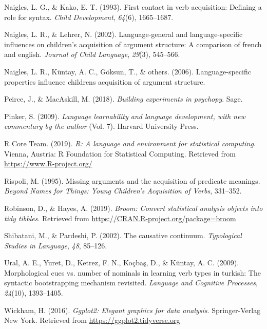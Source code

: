 \documentclass[man]{apa6}
\begin{document}
\hypertarget{ref-naigles1993first}{}
Naigles, L. G., \& Kako, E. T. (1993). First contact in verb
acquisition: Defining a role for syntax. \emph{Child Development},
\emph{64}(6), 1665--1687.

\hypertarget{ref-naigles2002language}{}
Naigles, L. R., \& Lehrer, N. (2002). Language-general and
language-specific influences on children's acquisition of argument
structure: A comparison of french and english. \emph{Journal of Child
Language}, \emph{29}(3), 545--566.

\hypertarget{ref-naigles2006language}{}
Naigles, L. R., Küntay, A. C., Göksun, T., \& others. (2006).
Language-specific properties influence childrens acquisition of argument
structure.

\hypertarget{ref-peirce2018building}{}
Peirce, J., \& MacAskill, M. (2018). \emph{Building experiments in
psychopy}. Sage.

\hypertarget{ref-pinker2009language}{}
Pinker, S. (2009). \emph{Language learnability and language development,
with new commentary by the author} (Vol. 7). Harvard University Press.

\hypertarget{ref-R-base}{}
R Core Team. (2019). \emph{R: A language and environment for statistical
computing}. Vienna, Austria: R Foundation for Statistical Computing.
Retrieved from \url{https://www.R-project.org/}

\hypertarget{ref-rispoli1995missing}{}
Rispoli, M. (1995). Missing arguments and the acquisition of predicate
meanings. \emph{Beyond Names for Things: Young Children's Acquisition of
Verbs}, 331--352.

\hypertarget{ref-R-broom}{}
Robinson, D., \& Hayes, A. (2019). \emph{Broom: Convert statistical
analysis objects into tidy tibbles}. Retrieved from
\url{https://CRAN.R-project.org/package=broom}

\hypertarget{ref-shibatani2002causative}{}
Shibatani, M., \& Pardeshi, P. (2002). The causative continuum.
\emph{Typological Studies in Language}, \emph{48}, 85--126.

\hypertarget{ref-ural2009morphological}{}
Ural, A. E., Yuret, D., Ketrez, F. N., Koçbaş, D., \& Küntay, A. C.
(2009). Morphological cues vs. number of nominals in learning verb types
in turkish: The syntactic bootstrapping mechanism revisited.
\emph{Language and Cognitive Processes}, \emph{24}(10), 1393--1405.

\hypertarget{ref-R-ggplot2}{}
Wickham, H. (2016). \emph{Ggplot2: Elegant graphics for data analysis}.
Springer-Verlag New York. Retrieved from
\url{https://ggplot2.tidyverse.org}
\end{document}
